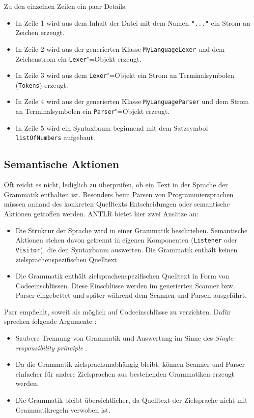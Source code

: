 Zu den einzelnen Zeilen ein paar Details:
\begin{itemize}
    \item In Zeile 1 wird aus dem Inhalt der Datei mit dem Namen \lstinline{"..."} ein Strom an Zeichen erzeugt.
    \item In Zeile 2 wird aus der generierten Klasse \lstinline{MyLanguageLexer} und dem Zeichenstrom ein \lstinline{Lexer}"=Objekt erzeugt.
    \item In Zeile 3 wird aus dem \lstinline{Lexer}"=Objekt ein Strom an Terminalsymbolen (\lstinline{Tokens}) erzeugt.
    \item In Zeile 4 wird aus der generierten Klasse \lstinline{MyLanguageParser} und dem Strom an Terminalsymbolen ein \lstinline{Parser}"=Objekt erzeugt.
    \item In Zeile 5 wird ein Syntaxbaum beginnend mit dem Satzsymbol \lstinline{listOfNumbers} aufgebaut.
\end{itemize}

\pagebreak
\subsection{Semantische Aktionen}

Oft reicht es nicht, lediglich zu überprüfen, ob ein Text in der Sprache der Grammatik enthalten ist. Besonders beim Parsen von Programmiersprachen müssen anhand des konkreten Quelltexts Entscheidungen oder semantische Aktionen getroffen werden. ANTLR bietet hier zwei Ansätze an:

\begin{itemize}
    \item Die Struktur der Sprache wird in einer Grammatik beschrieben. Semantische Aktionen stehen davon getrennt in eigenen Komponenten (\lstinline{Listener} oder \lstinline{Visitor}), die den Syntaxbaum auswerten. Die Grammatik enthält keinen zielsprachenspezifischen Quelltext.
    \item Die Grammatik enthält zielsprachenspezifischen Quelltext in Form von Codeeinschlüssen. Diese Einschlüsse werden im generierten Scanner bzw. Parser eingebettet und später während dem Scannen und Parsen ausgeführt. 
\end{itemize}

Parr empfiehlt, soweit als möglich auf Codeeinschlüsse zu verzichten. Dafür sprechen folgende Argumente \cite{ANTLR4Reference}:
\begin{itemize}
    \item Saubere Trennung von Grammatik und Auswertung im Sinne des \emph{Single-res\-pon\-si\-bi\-li\-ty principle} \cite{AgileSoftwareDevelopmentPPP}.
    \item Da die Grammatik zielsprachunabhängig bleibt, können Scanner und Parser einfacher für andere Zielsprachen aus bestehenden Grammatiken erzeugt werden.
    \item Die Grammatik bleibt übersichtlicher, da Quelltext der Zielsprache nicht mit Grammatikregeln verwoben ist.
\end{itemize}

